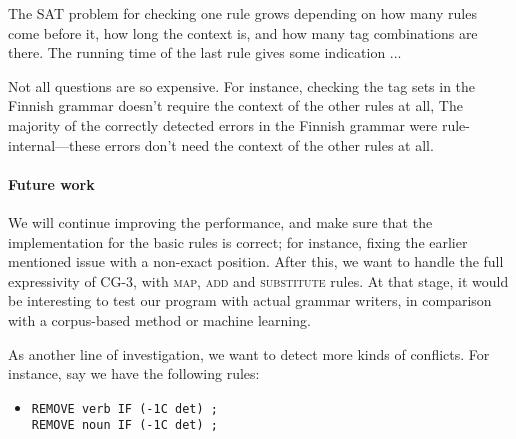 The SAT problem for checking one rule grows depending on how many rules come before it, how long the context is, and how many tag combinations are there. The running time of the last rule gives some indication ...

Not all questions are so expensive.
For instance, checking the tag sets in the Finnish grammar doesn't require the context of the other rules at all,
 The majority of the correctly detected errors in the Finnish grammar were rule-internal---these errors don't need the context of the other rules at all.





\paragraph{Future work} We will continue improving the performance, and make sure that the implementation for the basic rules is correct; for instance, fixing the earlier mentioned issue with a non-exact position.
After this, we want to handle the full expressivity of CG-3, with \textsc{map}, \textsc{add} and \textsc{substitute} rules.
At that stage, it would be interesting to test our program with actual grammar writers,
in comparison with a corpus-based method or machine learning.

As another line of investigation, we want to detect more kinds of conflicts.
For instance, say we have the following rules:

\begin{itemize}
\item[] \begin{verbatim}
REMOVE verb IF (-1C det) ;
REMOVE noun IF (-1C det) ;
\end{verbatim}
\end{itemize}

